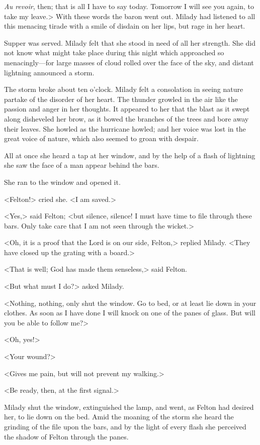 \textit{Au revoir}, then; that is all I have to say today. Tomorrow I will see you again, to take my leave.> With these words the baron went out. Milady had listened to all this menacing tirade with a smile of disdain on her lips, but rage in her heart. 

Supper was served. Milady felt that she stood in need of all her strength. She did not know what might take place during this night which approached so menacingly---for large masses of cloud rolled over the face of the sky, and distant lightning announced a storm. 

The storm broke about ten o'clock. Milady felt a consolation in seeing nature partake of the disorder of her heart. The thunder growled in the air like the passion and anger in her thoughts. It appeared to her that the blast as it swept along disheveled her brow, as it bowed the branches of the trees and bore away their leaves. She howled as the hurricane howled; and her voice was lost in the great voice of nature, which also seemed to groan with despair. 

All at once she heard a tap at her window, and by the help of a flash of lightning she saw the face of a man appear behind the bars. 

She ran to the window and opened it. 

<Felton!> cried she. <I am saved.> 

<Yes,> said Felton; <but silence, silence! I must have time to file through these bars. Only take care that I am not seen through the wicket.> 

<Oh, it is a proof that the Lord is on our side, Felton,> replied Milady. <They have closed up the grating with a board.> 

<That is well; God has made them senseless,> said Felton. 

<But what must I do?> asked Milady. 

<Nothing, nothing, only shut the window. Go to bed, or at least lie down in your clothes. As soon as I have done I will knock on one of the panes of glass. But will you be able to follow me?> 

<Oh, yes!> 

<Your wound?> 

<Gives me pain, but will not prevent my walking.> 

<Be ready, then, at the first signal.> 

Milady shut the window, extinguished the lamp, and went, as Felton had desired her, to lie down on the bed. Amid the moaning of the storm she heard the grinding of the file upon the bars, and by the light of every flash she perceived the shadow of Felton through the panes. 

